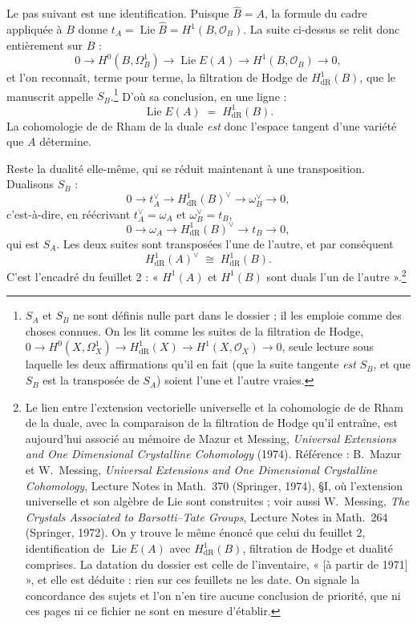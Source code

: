 \documentclass[11pt,a4paper]{article}
\begin{document}
Le pas suivant est une identification. Puisque
$\widehat{B} = A$, la formule du cadre appliquée à $B$ donne
$t_A = \operatorname{Lie} \widehat{B} = H^1(B, \mathcal{O}_B)$. La suite
ci-dessus se relit donc entièrement sur $B$ :
\[
  0 \longrightarrow H^0(B, \Omega^1_B) \longrightarrow \operatorname{Lie} E(A)
    \longrightarrow H^1(B, \mathcal{O}_B) \longrightarrow 0 ,
\]
et l'on reconnaît, terme pour terme, la filtration de Hodge de
$H^1_{\mathrm{dR}}(B)$, que le manuscrit appelle $S_B$.\footnote{$S_A$ et
$S_B$ ne sont définis nulle part dans le dossier ; il les emploie comme des
choses connues. On les lit comme les suites de la filtration de Hodge, $0 \to
H^0(X,\Omega^1_X) \to H^1_{\mathrm{dR}}(X) \to H^1(X,\mathcal{O}_X) \to 0$,
seule lecture sous laquelle les deux affirmations qu'il en fait (que la suite
tangente \emph{est} $S_B$, et que $S_B$ est la transposée de $S_A$) soient
l'une et l'autre vraies.} D'où sa conclusion, en une ligne :
\[
  \operatorname{Lie} E(A) \;=\; H^1_{\mathrm{dR}}(B).
\]
La cohomologie de de Rham de la duale \emph{est} donc l'espace tangent d'une
variété que $A$ détermine.

Reste la dualité elle-même, qui se réduit maintenant à une transposition. Dualisons
$S_B$ :
\[
  0 \longrightarrow t_A^{\vee} \longrightarrow H^1_{\mathrm{dR}}(B)^{\vee}
    \longrightarrow \omega_B^{\vee} \longrightarrow 0 ,
\]
c'est-à-dire, en réécrivant $t_A^{\vee} = \omega_A$ et $\omega_B^{\vee} = t_B$,
\[
  0 \longrightarrow \omega_A \longrightarrow H^1_{\mathrm{dR}}(B)^{\vee}
    \longrightarrow t_B \longrightarrow 0 ,
\]
qui est $S_A$. Les deux suites sont transposées l'une de l'autre, et par
conséquent
\[
  H^1_{\mathrm{dR}}(A)^{\vee} \;\cong\; H^1_{\mathrm{dR}}(B).
\]
C'est l'encadré du feuillet 2 : « $H^1(A)$ et $H^1(B)$ sont duals l'un de
l'autre ».\footnote{Le lien entre l'extension vectorielle universelle et la
cohomologie de de Rham de la duale, avec la comparaison de la filtration de
Hodge qu'il entraîne, est aujourd'hui associé au mémoire de Mazur et Messing,
\emph{Universal Extensions and One Dimensional Crystalline Cohomology} (1974).
Référence : B.~Mazur et W.~Messing, \emph{Universal Extensions and One
Dimensional Crystalline Cohomology}, Lecture Notes in Math.\ 370 (Springer,
1974), §I, où l'extension universelle et son algèbre de Lie sont construites ;
voir aussi W.~Messing, \emph{The Crystals Associated to Barsotti--Tate Groups},
Lecture Notes in Math.\ 264 (Springer, 1972). On y trouve le même énoncé que
celui du feuillet 2, identification de $\operatorname{Lie} E(A)$ avec
$H^1_{\mathrm{dR}}(B)$, filtration de Hodge et dualité comprises.
La datation du dossier est celle de l'inventaire, « [à partir de 1971] », et
elle est déduite : rien sur ces feuillets ne les date. On signale la
concordance des sujets et l'on n'en tire aucune conclusion de priorité, que ni
ces pages ni ce fichier ne sont en mesure d'établir.}
\end{document}
